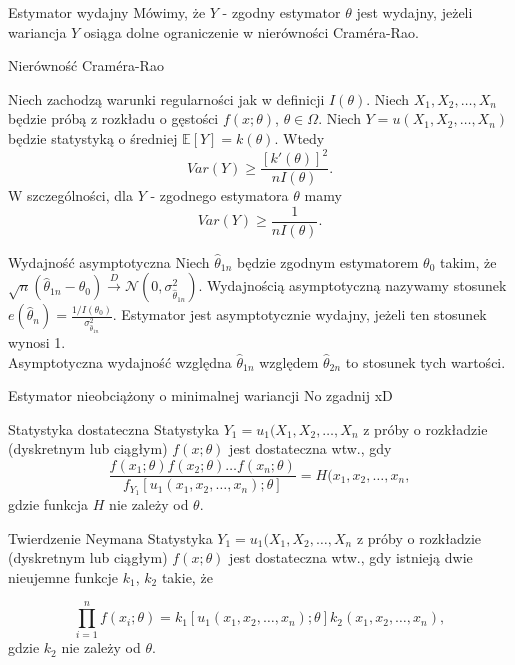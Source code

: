 \documentclass[avery5371, grid, frame]{flashcards}
\begin{document}
\begin{flashcard}[Definicja]{Estymator wydajny}
    Mówimy, że $Y$ - zgodny estymator $\theta$ jest wydajny, jeżeli wariancja $Y$ osiąga dolne ograniczenie w nierówności Cram\'era-Rao.
\end{flashcard}

\begin{flashcard}[Twierdzenie]{Nierówność Cram\'era-Rao}
\begin{small}
    Niech zachodzą warunki regularności jak w definicji $I(\theta)$. Niech $X_1, X_2, \dots, X_n$ będzie próbą z rozkładu o gęstości $f(x; \theta)$, $\theta \in \Omega$. Niech $Y = u(X_1, X_2, \dots, X_n)$ będzie statystyką o średniej $\mathbb{E}[Y] = k(\theta)$. Wtedy $$ Var(Y) \geq \frac{[k'(\theta)]^2}{n I(\theta)}.$$
    W szczególności, dla $Y$ - zgodnego estymatora $\theta$ mamy $$ Var(Y) \geq \frac{1}{n I(\theta)}.$$
\end{small}
\end{flashcard}

\begin{flashcard}[Definicja]{Wydajność asymptotyczna}
    Niech $\hat{\theta}_{1n}$ będzie zgodnym estymatorem $\theta_0$ takim, że $\sqrt{n}(\hat{\theta}_{1n} - \theta_0) \xrightarrow{D} \mathcal{N}(0, \sigma_{\hat{\theta}_{1n}}^2).$ Wydajnością asymptotyczną nazywamy stosunek $e(\hat{\theta}_{n}) = \frac{1/I(\theta_0)}{\sigma_{\hat{\theta}_{1n}}^2}$. Estymator jest asymptotycznie wydajny, jeżeli ten stosunek wynosi 1. \\
    Asymptotyczna wydajność względna $\hat{\theta}_{1n}$ względem $\hat{\theta}_{2n}$ to stosunek tych wartości.
    
\end{flashcard}

\begin{flashcard}[Definicja]{Estymator nieobciążony o minimalnej wariancji}
    No zgadnij xD
\end{flashcard}

\begin{flashcard}[Definicja]{Statystyka dostateczna}
    Statystyka $Y_1 = u_1(X_1, X_2, \dots, X_n$ z próby o rozkładzie (dyskretnym lub ciągłym) $f(x; \theta)$ jest dostateczna wtw., gdy
    $$ \frac{f(x_1; \theta) f(x_2; \theta) \dots f(x_n; \theta)}{f_{Y_1}[u_1(x_1, x_2, \dots, x_n); \theta]} = H(x_1, x_2, \dots, x_n, $$ gdzie funkcja $H$ nie zależy od $\theta$.
\end{flashcard}

\begin{flashcard}[Twierdzenie]{Twierdzenie Neymana}
    Statystyka $Y_1 = u_1(X_1, X_2, \dots, X_n$ z próby o rozkładzie (dyskretnym lub ciągłym) $f(x; \theta)$ jest dostateczna wtw., gdy istnieją dwie nieujemne funkcje $k_1$, $k_2$ takie, że
    \begin{small}
    $$ \prod_{i=1}^n f(x_i; \theta) = k_1[u_1(x_1, x_2, \dots, x_n); \theta] k_2(x_1, x_2, \dots, x_n), $$ gdzie $k_2$ nie zależy od $\theta$.
    \end{small}
\end{flashcard}
\end{document}
